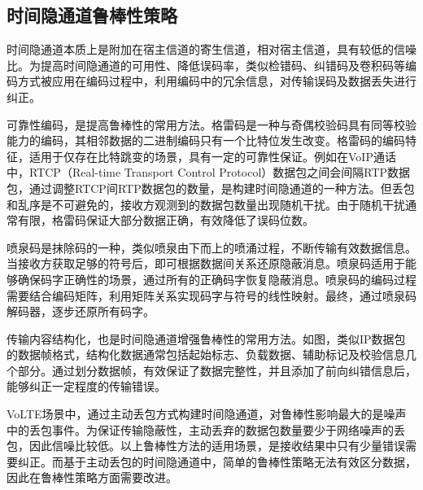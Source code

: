 \subsection{时间隐通道鲁棒性策略}
\label{sec:intro:background:robustness}

时间隐通道本质上是附加在宿主信道的寄生信道，相对宿主信道，具有较低的信噪比。为提高时间隐通道的可用性、降低误码率，类似检错码、纠错码及卷积码等编码方式被应用在编码过程中，利用编码中的冗余信息，对传输误码及数据丢失进行纠正。

可靠性编码，是提高鲁棒性的常用方法。格雷码是一种与奇偶校验码具有同等校验能力的编码，其相邻数据的二进制编码只有一个比特位发生改变。格雷码的编码特征，适用于仅存在比特跳变的场景，具有一定的可靠性保证。例如在VoIP通话中，RTCP（Real-time Transport Control Protocol）数据包之间会间隔RTP数据包，通过调整RTCP间RTP数据包的数量，是构建时间隐通道的一种方法。但丢包和乱序是不可避免的，接收方观测到的数据包数量出现随机干扰。由于随机干扰通常有限，格雷码保证大部分数据正确，有效降低了误码位数。

喷泉码是抹除码的一种，类似喷泉由下而上的喷涌过程，不断传输有效数据信息。当接收方获取足够的符号后，即可根据数据间关系还原隐蔽消息。喷泉码适用于能够确保码字正确性的场景，通过所有的正确码字恢复隐蔽消息。喷泉码的编码过程需要结合编码矩阵，利用矩阵关系实现码字与符号的线性映射。最终，通过喷泉码解码器，逐步还原所有码字。


传输内容结构化，也是时间隐通道增强鲁棒性的常用方法。如图，类似IP数据包的数据帧格式，结构化数据通常包括起始标志、负载数据、辅助标记及校验信息几个部分。通过划分数据帧，有效保证了数据完整性，并且添加了前向纠错信息后，能够纠正一定程度的传输错误。

VoLTE场景中，通过主动丢包方式构建时间隐通道，对鲁棒性影响最大的是噪声中的丢包事件。为保证传输隐蔽性，主动丢弃的数据包数量要少于网络噪声的丢包，因此信噪比较低。以上鲁棒性方法的适用场景，是接收结果中只有少量错误需要纠正。而基于主动丢包的时间隐通道中，简单的鲁棒性策略无法有效区分数据，因此在鲁棒性策略方面需要改进。

